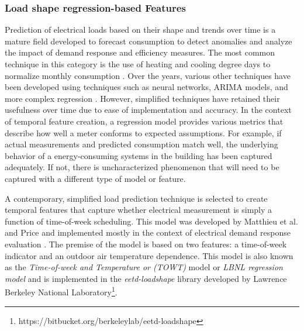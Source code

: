 \subsubsection{Load shape regression-based Features}
\label{sec:regressionmetrics}

Prediction of electrical loads based on their shape and trends over time is a mature field developed to forecast consumption to detect anomalies and analyze the impact of demand response and efficiency measures. The most common technique in this category is the use of heating and cooling degree days to normalize monthly consumption \cite{fels_prism:_1986}. Over the years, various other techniques have been developed using techniques such as neural networks, ARIMA models, and more complex regression \cite{taylor_comparison_2006}. However, simplified techniques have retained their usefulness over time due to ease of implementation and accuracy. In the context of temporal feature creation, a regression model provides various metrics that describe how well a meter conforms to expected assumptions. For example, if actual measurements and predicted consumption match well, the underlying behavior of a energy-consuming systems in the building has been captured adequately. If not, there is uncharacterized phenomenon that will need to be captured with a different type of model or feature. 

A contemporary, simplified load prediction technique is selected to create temporal features that capture whether electrical measurement is simply a function of time-of-week scheduling. This model was developed by Matthieu et al. and Price and implemented mostly in the context of electrical demand response evaluation \cite{price_methods_2010, mathieu_quantifying_2011}. The premise of the model is based on two features: a time-of-week indicator and an outdoor air temperature dependence. This model is also known as the \emph{Time-of-week and Temperature or (TOWT)} model or \emph{LBNL regression model} and is implemented in the \emph{eetd-loadshape} library developed by Lawrence Berkeley National Laboratory\footnote{https://bitbucket.org/berkeleylab/eetd-loadshape}.

